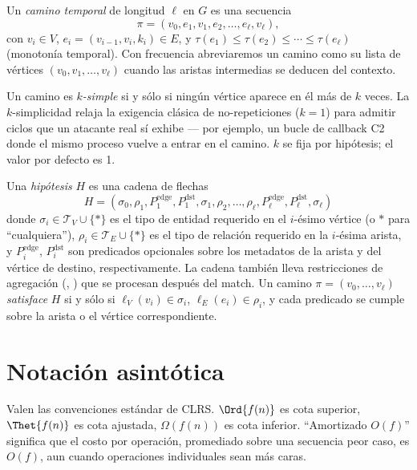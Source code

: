 \begin{definition}
Un \emph{camino temporal} de longitud $\ell$ en $G$ es una
secuencia
\[
    \pi = (v_0, e_1, v_1, e_2, \ldots, e_\ell, v_\ell),
\]
con $v_i \in V$, $e_i = (v_{i-1}, v_i, k_i) \in E$, y
$\tau(e_1) \leq \tau(e_2) \leq \cdots \leq \tau(e_\ell)$
(monotonía temporal). Con frecuencia abreviaremos un camino como
su lista de vértices $(v_0, v_1, \ldots, v_\ell)$ cuando las
aristas intermedias se deducen del contexto.
\end{definition}

\begin{definition}
Un camino es \emph{$k$-simple} si y sólo si ningún vértice aparece
en él más de $k$ veces. La $k$-simplicidad relaja la exigencia
clásica de no-repeticiones ($k=1$) para admitir ciclos que un
atacante real sí exhibe --- por ejemplo, un bucle de callback C2
donde el mismo proceso vuelve a entrar en el camino. $k$ se fija
por hipótesis; el valor por defecto es 1.
\end{definition}

\begin{definition}[Hipótesis]
Una \emph{hipótesis} $H$ es una cadena de flechas
\[
    H = (\sigma_0, \rho_1, P_1^{\text{edge}}, P_1^{\text{dst}},
        \sigma_1, \rho_2, \ldots, \rho_\ell, P_\ell^{\text{edge}},
        P_\ell^{\text{dst}}, \sigma_\ell)
\]
donde $\sigma_i \in \mathcal{T}_V \cup \{\ast\}$ es el tipo de
entidad requerido en el $i$-ésimo vértice (o $\ast$ para
``cualquiera''), $\rho_i \in \mathcal{T}_E \cup \{\ast\}$ es el
tipo de relación requerido en la $i$-ésima arista, y
$P_i^{\text{edge}}$, $P_i^{\text{dst}}$ son predicados opcionales
sobre los metadatos de la arista y del vértice de destino,
respectivamente. La cadena también lleva restricciones de
agregación (, ) que se procesan después
del match. Un camino $\pi = (v_0, \ldots, v_\ell)$
\emph{satisface} $H$ si y sólo si $\ell_V(v_i) \in \sigma_i$,
$\ell_E(e_i) \in \rho_i$, y cada predicado se cumple sobre la
arista o el vértice correspondiente.
\end{definition}

\section{Notación asintótica}

Valen las convenciones estándar de CLRS. $\Ord{f(n)}$ es cota
superior, $\Thet{f(n)}$ es cota ajustada, $\Omega(f(n))$ es cota
inferior. ``Amortizado $O(f)$'' significa que el costo por
operación, promediado sobre una secuencia peor caso, es $O(f)$,
aun cuando operaciones individuales sean más caras.

